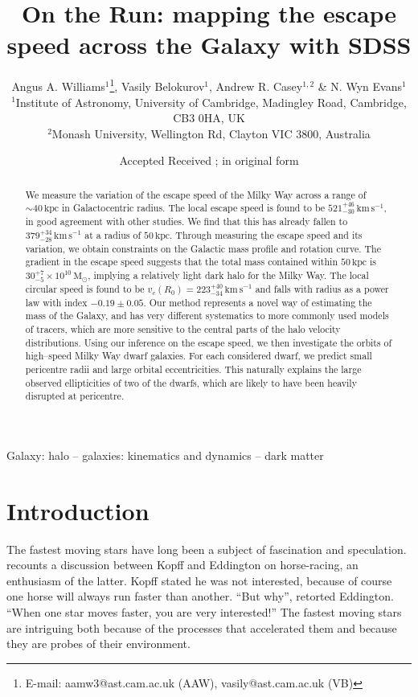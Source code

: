 \documentclass[useAMS,twocolumn,usenatbib]{mn2e}
\title[Fast moving stars in SDSS] {On the Run: mapping the escape speed across the Galaxy with SDSS}
\author[Williams, Belokurov, Casey \& Evans]{Angus A. Williams$^1$\thanks{E-mail: aamw3@ast.cam.ac.uk (AAW), vasily@ast.cam.ac.uk (VB)},
  Vasily Belokurov$^1$\footnotemark[1], Andrew R. Casey$^{1,2}$ \& N. Wyn Evans$^1$
  \medskip
  \\$^1$Institute of Astronomy, University of Cambridge, Madingley Road, Cambridge, CB3 0HA, UK
  \\$^2$Monash University, Wellington Rd, Clayton VIC 3800, Australia}
\def\kpc{{\,\mathrm{kpc}}}
\def\kms{{\,\mathrm{km\,s^{-1}}}}
\def\Msun{{\,\mathrm{M}_\odot}}
\begin{document}
\date{Accepted  Received ; in original form }

\pagerange{\pageref{firstpage}--\pageref{lastpage}} 

\maketitle

\label{firstpage}

\begin{abstract}
We measure the variation of the escape speed of the Milky Way across a range of $\sim 40\kpc$ in Galactocentric radius. 
The local escape speed is found to be $521^{+46}_{-30}\kms$, in good agreement with other studies. 
We find that this has already fallen to $379^{+34}_{-28}\kms$ at a radius of $50\kpc$. 
Through measuring the escape speed and its variation, we obtain constraints on the Galactic mass profile and rotation curve. 
The gradient in the escape speed suggests that the total mass contained within $50\kpc$ is $30^{+7}_{-5}\times10^{10}\Msun$, implying a relatively light dark halo for the Milky Way. 
The local circular speed is found to be $v_c(R_0) = 223^{+40}_{-34}\kms$ and falls with radius as a power law with index $-0.19\pm0.05$. 
Our method represents a novel way of estimating the mass of the Galaxy, and has very different systematics to more commonly used models of tracers, which are more sensitive to the central parts of the halo velocity distributions. 
Using our inference on the escape speed, we then investigate the orbits of high--speed Milky Way dwarf galaxies. 
For each considered dwarf, we predict small pericentre radii and large orbital eccentricities. 
This naturally explains the large observed ellipticities of two of the dwarfs, which are likely to have been heavily disrupted at pericentre.
\end{abstract}

\begin{keywords}
Galaxy: halo -- galaxies: kinematics and dynamics -- dark matter
\end{keywords}

\section{Introduction}

The fastest moving stars have long been a subject of fascination and speculation. 
\citet{Vi56} recounts a discussion between Kopff and Eddington on horse-racing, an enthusiasm of the latter. 
Kopff stated he was not interested, because of course one horse will always run faster than another.  
``But why'', retorted Eddington. ``When one star moves faster, you are very interested!'' 
The fastest moving stars are intriguing both because of the processes that accelerated them and because they are probes of their environment.
\end{document}
